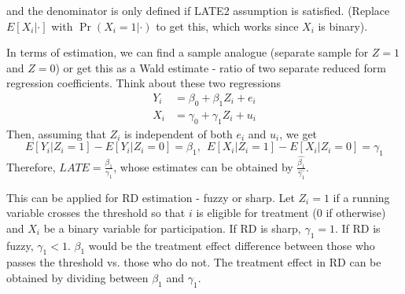 \documentclass[12pt]{article}
\theoremstyle{definition}
\theoremstyle{property}
\theoremstyle{assumption}
\theoremstyle{example}
\theoremstyle{comment}
\begin{document}
and the denominator is only defined if LATE2 assumption is satisfied. (Replace $E[X_i|\cdot]$ with $\Pr(X_i=1|\cdot)$ to get this, which works since $X_i$ is binary).
\par In terms of estimation, we can find a sample analogue (separate sample for $Z=1$ and $Z=0$) or get this as a Wald estimate - ratio of two separate reduced form regression coefficients. Think about these two regressions
\[
\begin{aligned}
Y_i &= \beta_0+\beta_1Z_i + e_i\\
X_i & = \gamma_0+\gamma_1Z_i + u_i
\end{aligned}
\]
Then, assuming that $Z_i$ is independent of both $e_i$ and $u_i$, we get
\[
E[Y_i|Z_i=1]-E[Y_i|Z_i=0] = \beta_1, \ \ E[X_i|Z_i=1]-E[X_i|Z_i=0] = \gamma_1
\] 
Therefore, $LATE = \frac{\beta_1}{\gamma_1}$, whose estimates can be obtained by $\frac{\hat{\beta_1}}{\hat{\gamma_1}}$. \par
This can be applied for RD estimation - fuzzy or sharp. Let $Z_i=1$ if a running variable crosses the threshold so that $i$ is eligible for treatment (0 if otherwise) and $X_i$ be a binary variable for participation. If RD is sharp, $\gamma_1=1$. If RD is fuzzy, $\gamma_1<1$. $\beta_1$ would be the treatment effect difference between those who passes the threshold vs. those who do not. The treatment effect in RD can be obtained by dividing between $\beta_1$ and $\gamma_1$. 
\end{document}
